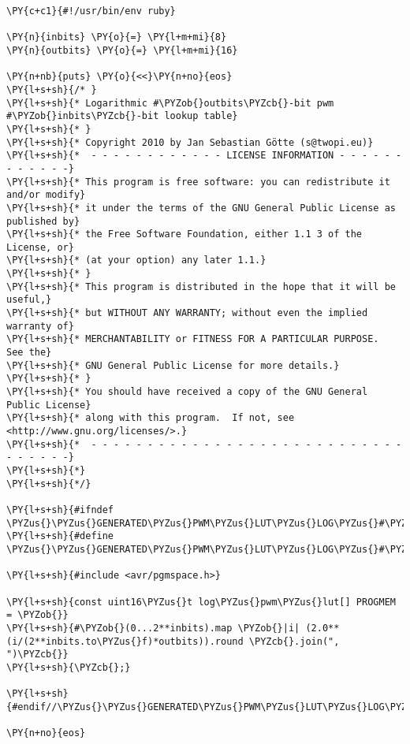 \begin{Verbatim}[commandchars=\\\{\},codes={\catcode`\$=3\catcode`\^=7\catcode`\_=8}]
\PY{c+c1}{#!/usr/bin/env ruby}

\PY{n}{inbits} \PY{o}{=} \PY{l+m+mi}{8}
\PY{n}{outbits} \PY{o}{=} \PY{l+m+mi}{16}

\PY{n+nb}{puts} \PY{o}{<<}\PY{n+no}{eos}
\PY{l+s+sh}{/* }
\PY{l+s+sh}{* Logarithmic #\PYZob{}outbits\PYZcb{}-bit pwm #\PYZob{}inbits\PYZcb{}-bit lookup table}
\PY{l+s+sh}{* }
\PY{l+s+sh}{* Copyright 2010 by Jan Sebastian Götte (s@twopi.eu)}
\PY{l+s+sh}{*  - - - - - - - - - - - - LICENSE INFORMATION - - - - - - - - - - - -}
\PY{l+s+sh}{* This program is free software: you can redistribute it and/or modify}
\PY{l+s+sh}{* it under the terms of the GNU General Public License as published by}
\PY{l+s+sh}{* the Free Software Foundation, either 1.1 3 of the License, or}
\PY{l+s+sh}{* (at your option) any later 1.1.}
\PY{l+s+sh}{* }
\PY{l+s+sh}{* This program is distributed in the hope that it will be useful,}
\PY{l+s+sh}{* but WITHOUT ANY WARRANTY; without even the implied warranty of}
\PY{l+s+sh}{* MERCHANTABILITY or FITNESS FOR A PARTICULAR PURPOSE.  See the}
\PY{l+s+sh}{* GNU General Public License for more details.}
\PY{l+s+sh}{* }
\PY{l+s+sh}{* You should have received a copy of the GNU General Public License}
\PY{l+s+sh}{* along with this program.  If not, see <http://www.gnu.org/licenses/>.}
\PY{l+s+sh}{*  - - - - - - - - - - - - - - - - - - - - - - - - - - - - - - - - - -}
\PY{l+s+sh}{*}
\PY{l+s+sh}{*/}

\PY{l+s+sh}{#ifndef \PYZus{}\PYZus{}GENERATED\PYZus{}PWM\PYZus{}LUT\PYZus{}LOG\PYZus{}#\PYZob{}inbits\PYZcb{}\PYZus{}#\PYZob{}outbits\PYZcb{}\PYZus{}\PYZus{}}
\PY{l+s+sh}{#define \PYZus{}\PYZus{}GENERATED\PYZus{}PWM\PYZus{}LUT\PYZus{}LOG\PYZus{}#\PYZob{}inbits\PYZcb{}\PYZus{}#\PYZob{}outbits\PYZcb{}\PYZus{}\PYZus{}}

\PY{l+s+sh}{#include <avr/pgmspace.h>}

\PY{l+s+sh}{const uint16\PYZus{}t log\PYZus{}pwm\PYZus{}lut[] PROGMEM = \PYZob{}}
\PY{l+s+sh}{#\PYZob{}(0...2**inbits).map \PYZob{}|i| (2.0**(i/(2**inbits.to\PYZus{}f)*outbits)).round \PYZcb{}.join(", ")\PYZcb{}}
\PY{l+s+sh}{\PYZcb{};}

\PY{l+s+sh}{#endif//\PYZus{}\PYZus{}GENERATED\PYZus{}PWM\PYZus{}LUT\PYZus{}LOG\PYZus{}#\PYZob{}inbits\PYZcb{}\PYZus{}#\PYZob{}outbits\PYZcb{}\PYZus{}\PYZus{}}

\PY{n+no}{eos}
\end{Verbatim}
